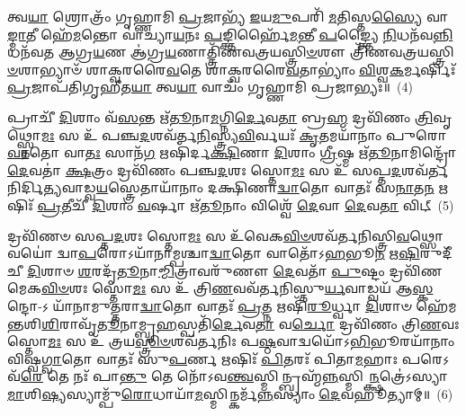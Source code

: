 𑌤𑍍𑌵\-\ul{𑌯𑌾} 𑌶𑍍𑌰𑍋𑌤𑍍𑌰𑌂᳴ 𑌗𑍃𑌹𑍍𑌣𑌾𑌮𑌿 \ul{𑌪𑍍𑌰}\-𑌜𑌾𑌭𑍍𑌯᳴ \ul{𑌇}\-𑌯\-\ul{𑌮𑍁}\-𑌪𑌰𑌿᳴ \ul{𑌮}\-𑌤𑌿𑌸𑍍𑌤\-\ul{𑌸𑍍𑌯𑍈} 𑌵𑌾\-\ul{𑌙𑍍𑌮𑌾}\-𑌤𑍀 𑌹𑍇᳴\-\ul{𑌮}\-𑌨𑍍𑌤𑍋 𑌵𑌾॑𑌚𑍍𑌯𑌾\-\ul{𑌯}\-𑌨𑌃 \ul{𑌪}\-𑌙𑍍𑌕𑍍𑌤𑌿𑌰𑍍\mbox{}𑌹𑍈᳴\-\ul{𑌮}\-𑌨𑍍𑌤𑍀 \ul{𑌪}\-𑌙𑍍𑌕𑍍𑌤𑍍𑌯𑍈 \ul{𑌨𑌿}\-𑌧𑌨᳴𑌵\-\ul{𑌨𑍍𑌨𑌿}\-𑌧𑌨᳴𑌵𑌤 𑌆𑌗𑍍𑌰\-\ul{𑌯}\-𑌣 𑌆॑𑌗𑍍𑌰\-\ul{𑌯}\-𑌣𑌾𑌤𑍍𑌤𑍍𑌰𑌿᳴𑌣𑌵𑌤𑍍𑌰𑌯𑌸𑍍𑌤𑍍𑌰𑌿\-\ul{𑍞}\-𑌶𑍗 𑌤𑍍𑌰𑌿᳴𑌣𑌵𑌤𑍍𑌰𑌯𑌸𑍍𑌤𑍍𑌰𑌿\-\ul{𑍞}\-𑌶𑌾𑌭𑍍𑌯𑌾𑍞᳴ 𑌶𑌾𑌕𑍍𑌵𑌰𑌰𑍈\-\ul{𑌵}\-𑌤𑍇 𑌶𑌾॑𑌕𑍍𑌵𑌰𑌰𑍈\-\ul{𑌵}\-𑌤𑌾\-𑌭𑍍𑌯𑌾𑌂॑ \ul{𑌵𑌿}\-𑌶𑍍𑌵\-\ul{𑌕}\-𑌰𑍍𑌮𑌰𑍍\mbox{}𑌷𑌿𑌃᳴ \ul{𑌪𑍍𑌰}\-𑌜𑌾𑌪᳴𑌤𑌿𑌗𑍃𑌹𑍀𑌤\-\ul{𑌯𑌾} 𑌤𑍍𑌵\-\ul{𑌯𑌾} 𑌵𑌾𑌚𑌂᳴ 𑌗𑍃𑌹𑍍𑌣𑌾𑌮𑌿 𑌪𑍍𑌰𑌜𑌾𑌭𑍍𑌯𑌃॥~(4)

{\anuvakamend[{𑌤𑍍𑌵\-\ul{𑌯𑌾} 𑌮𑌨𑍋᳴ \ul{𑌜}\-𑌮𑌦᳴\-\ul{𑌗𑍍𑌨𑌿}\-𑌰𑍍\mbox{}𑌋𑌷𑌿𑌃᳴ \ul{𑌪𑍍𑌰}\-𑌜𑌾𑌪᳴𑌤𑌿𑌗𑍃𑌹𑍀𑌤𑌯𑌾 \ul{𑌤𑍍𑌰𑌿}\-\-\ul{𑍞}\-𑌶𑌚𑍍𑌚᳴}]}%

𑌪𑍍𑌰𑌾𑌚𑍀᳴ \ul{𑌦𑌿}\-𑌶𑌾𑌂 𑌵᳴\-\ul{𑌸}\-𑌨𑍍𑌤 𑌋᳴\-\ul{𑌤𑍂}\-𑌨𑌾\-\ul{𑌮}\-𑌗𑍍𑌨𑌿\-\ul{𑌰𑍍𑌦𑍇}\-𑌵\-\ul{𑌤𑌾} 𑌬𑍍𑌰\-\ul{𑌹𑍍𑌮} 𑌦𑍍𑌰𑌵𑌿᳴𑌣𑌂 \ul{𑌤𑍍𑌰𑌿}\-𑌵𑍃𑌥𑍍𑌸𑍍𑌤𑍋\-\ul{𑌮𑌃} 𑌸 𑌉᳴ 𑌪𑌞𑍍𑌚\-\ul{𑌦}\-𑌶𑌵᳴𑌰𑍍𑌤\-\ul{𑌨𑌿}\-𑌸𑍍𑌤𑍍𑌰𑍍𑌯\-\ul{𑌵𑌿}\-𑌰𑍍𑌵𑌯𑌃᳴ \ul{𑌕𑍃}\-𑌤𑌮𑌯𑌾᳴𑌨𑌾𑌂 𑌪𑍁𑌰𑍋\-\ul{𑌵𑌾}\-𑌤𑍋 𑌵𑌾\-\ul{𑌤𑌃} 𑌸𑌾𑌨᳴\-\ul{𑌗} 𑌋𑌷𑌿᳴𑌰𑍍𑌦\-\ul{𑌕𑍍𑌷𑌿}\-𑌣𑌾 \ul{𑌦𑌿}\-𑌶𑌾𑌂 \ul{𑌗𑍍𑌰𑍀}\-𑌷𑍍𑌮 𑌋᳴\-\ul{𑌤𑍂}\-𑌨𑌾𑌮𑌿𑌨𑍍𑌦𑍍𑌰𑍋᳴ \ul{𑌦𑍇}\-𑌵𑌤𑌾॑ \ul{𑌕𑍍𑌷}\-𑌤𑍍𑌰𑌂 𑌦𑍍𑌰𑌵𑌿᳴𑌣𑌂 𑌪𑌞𑍍𑌚\-\ul{𑌦}\-𑌶𑌃 𑌸𑍍𑌤𑍋\-\ul{𑌮𑌃} 𑌸 𑌉᳴ 𑌸𑌪𑍍𑌤\-\ul{𑌦}\-𑌶𑌵᳴𑌰𑍍𑌤𑌨𑌿𑌰𑍍𑌦𑌿\-\ul{𑌤𑍍𑌯}\-𑌵𑌾𑌡𑍍𑌵\-\ul{𑌯}\-𑌸𑍍𑌤𑍍𑌰𑍇𑌤𑌾𑌯𑌾᳴𑌨𑌾𑌂 𑌦𑌕𑍍𑌷𑌿𑌣𑌾\-\ul{𑌦𑍍𑌵𑌾}\-𑌤𑍋 𑌵𑌾𑌤𑌃᳴ 𑌸\-\ul{𑌨𑌾}\-𑌤\-\ul{𑌨} 𑌋𑌷𑌿𑌃᳴ \ul{𑌪𑍍𑌰}\-𑌤𑍀𑌚𑍀᳴ \ul{𑌦𑌿}\-𑌶𑌾𑌂 \ul{𑌵}\-𑌰𑍍\mbox{}𑌷𑌾 𑌋᳴\-\ul{𑌤𑍂}\-𑌨𑌾𑌂 𑌵𑌿𑌶𑍍𑌵𑍇᳴ \ul{𑌦𑍇}\-𑌵𑌾 \ul{𑌦𑍇}\-𑌵\-\ul{𑌤𑌾} 𑌵𑌿𑌟𑍍~(5)

𑌦𑍍𑌰𑌵𑌿᳴𑌣𑍞 𑌸𑌪𑍍𑌤\-\ul{𑌦}\-𑌶𑌃 𑌸𑍍𑌤𑍋\-\ul{𑌮𑌃} 𑌸 𑌉᳴𑌵𑍇𑌕\-\ul{𑌵𑌿}\-\-\ul{𑍞}\-𑌶𑌵᳴𑌰𑍍𑌤𑌨𑌿𑌸𑍍𑌤𑍍𑌰𑌿\-\ul{𑌵}\-𑌥𑍍𑌸𑍋 𑌵𑌯𑍋॑ 𑌦𑍍𑌵𑌾\-\ul{𑌪}\-𑌰𑍋\-𑌽𑌯𑌾᳴𑌨𑌾𑌮𑍍𑌪𑌶𑍍𑌚𑌾\-\ul{𑌦𑍍𑌵𑌾}\-𑌤𑍋 𑌵𑌾𑌤𑍋᳴\-𑌽\-\ul{𑌹}\-𑌭𑍂\-\ul{𑌨} 𑌋\-\ul{𑌷𑌿}\-𑌰𑍁𑌦𑍀᳴𑌚𑍀 \ul{𑌦𑌿}\-𑌶𑌾𑍞 \ul{𑌶}\-𑌰𑌦𑍃᳴\-\ul{𑌤𑍂}\-𑌨𑌾\-\ul{𑌮𑍍𑌮𑌿}\-𑌤𑍍𑌰𑌾𑌵𑌰𑍁᳴𑌣𑍗 \ul{𑌦𑍇}\-𑌵𑌤𑌾᳴ \ul{𑌪𑍁}\-𑌷𑍍𑌟𑌂 𑌦𑍍𑌰𑌵𑌿᳴𑌣𑌮𑍇𑌕\-\ul{𑌵𑌿}\-\-\ul{𑍞}\-𑌶𑌃 𑌸𑍍𑌤𑍋\-\ul{𑌮𑌃} 𑌸 𑌉᳴ 𑌤𑍍𑌰𑌿\-\ul{𑌣}\-𑌵𑌵᳴𑌰𑍍𑌤𑌨𑌿𑌸𑍍𑌤𑍁\-\ul{𑌰𑍍𑌯}\-𑌵𑌾𑌡𑍍𑌵𑌯᳴ 𑌆\-\ul{𑌸𑍍𑌕}\-𑌨𑍍𑌦𑍋-\-𑌽 𑌯𑌾᳴𑌨𑌾𑌮𑍁𑌤𑍍𑌤𑌰𑌾\-\ul{𑌦𑍍𑌵𑌾}\-𑌤𑍋 𑌵𑌾𑌤𑌃᳴ \ul{𑌪𑍍𑌰}\-𑌤𑍍𑌨 𑌋𑌷𑌿᳴\-\ul{𑌰𑍂}\-𑌰𑍍𑌧𑍍𑌵𑌾 \ul{𑌦𑌿}\-𑌶𑌾𑍞 𑌹𑍇᳴𑌮𑌨𑍍𑌤𑌶𑌿\-\ul{𑌶𑌿}\-𑌰𑌾𑌵𑍃᳴\-\ul{𑌤𑍂}\-𑌨𑌾𑌮𑍍𑌬𑍃\-\ul{𑌹}\-𑌸𑍍𑌪𑌤𑌿᳴\-\ul{𑌰𑍍𑌦𑍇}\-𑌵\-\ul{𑌤𑌾} 𑌵\-\ul{𑌰𑍍𑌚𑍋} 𑌦𑍍𑌰𑌵𑌿᳴𑌣𑌂 𑌤𑍍𑌰𑌿\-\ul{𑌣}\-𑌵𑌃 𑌸𑍍𑌤𑍋\-\ul{𑌮𑌃} 𑌸 𑌉᳴ 𑌤𑍍𑌰𑌯\-\ul{𑌸𑍍𑌤𑍍𑌰𑌿}\-\-\ul{𑍞}\-𑌶𑌵᳴𑌰𑍍𑌤𑌨𑌿𑌃 𑌪\-\ul{𑌷𑍍𑌠}\-𑌵𑌾𑌦𑍍𑌵𑌯𑍋᳴\-𑌽\-\ul{𑌭𑌿}\-𑌭𑍂𑌰𑌯𑌾᳴𑌨𑌾𑌂 𑌵𑌿𑌷𑍍𑌵\-\ul{𑌗𑍍𑌵𑌾}\-𑌤𑍋 𑌵𑌾𑌤𑌃᳴ 𑌸𑍁\-\ul{𑌪}\-𑌰𑍍𑌣 𑌋𑌷𑌿𑌃᳴ \ul{𑌪𑌿}\-𑌤𑌰𑌃᳴ 𑌪𑌿𑌤𑌾\-\ul{𑌮}\-𑌹𑌾𑌃 𑌪𑌰𑍇\-𑌽𑌵᳴\-\ul{𑌰𑍇} 𑌤𑍇 𑌨𑌃᳴ 𑌪𑌾\-\ul{𑌨𑍍𑌤𑍁} 𑌤𑍇 𑌨𑍋᳴\-𑌽𑌵\-\ul{𑌨𑍍𑌤𑍍𑌵}\-𑌸𑍍𑌮𑌿𑌨𑍍𑌬𑍍𑌰𑌹𑍍𑌮᳴\-\ul{𑌨𑍍𑌨}\-𑌸𑍍𑌮𑌿\-\ul{𑌨𑍍𑌕𑍍𑌷}\-𑌤𑍍𑌰𑍇॑\-𑌽𑌸𑍍𑌯𑌾\-\ul{𑌮𑌾}\-𑌶𑌿\-\ul{𑌷𑍍𑌯}\-𑌸𑍍𑌯𑌾𑌮𑍍𑌪𑍁᳴\-\ul{𑌰𑍋}\-𑌧𑌾𑌯𑌾᳴\-\ul{𑌮}\-𑌸𑍍𑌮𑌿𑌨𑍍𑌕𑌰𑍍𑌮᳴\-\ul{𑌨𑍍𑌨}\-𑌸𑍍𑌯𑌾𑌂 \ul{𑌦𑍇}\-𑌵𑌹𑍂॑𑌤𑍍𑌯𑌾𑌮𑍍॥~(6)

{\anuvakamend[{𑌵𑌿𑌟𑍍𑌪᳴\-\ul{𑌷𑍍𑌠}\-𑌵𑌾𑌡𑍍𑌵\-\ul{𑌯𑍋}\-\-𑌽𑌷𑍍𑌟𑌾𑌵𑌿𑍞᳴𑌶𑌤𑌿𑌶𑍍𑌚}]}%

